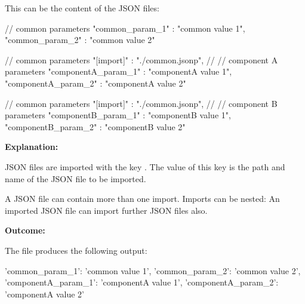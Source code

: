 \vspace{2ex}

This can be the content of the JSON files:

\vspace{2ex}

\textbullet {}

\begin{pythoncode}
{
   // common parameters
   "common_param_1" : "common value 1",
   "common_param_2" : "common value 2"
}
\end{pythoncode}

\textbullet {}

\begin{pythoncode}[linebackgroundcolor=\hlcode{3}]
{
   // common parameters
   "[import]" : "./common.jsonp",
   //
   // component A parameters
   "componentA_param_1" : "componentA value 1",
   "componentA_param_2" : "componentA value 2"
}
\end{pythoncode}

\textbullet {}

\begin{pythoncode}[linebackgroundcolor=\hlcode{3}]
{
   // common parameters
   "[import]" : "./common.jsonp",
   //
   // component B parameters
   "componentB_param_1" : "componentB value 1",
   "componentB_param_2" : "componentB value 2"
}
\end{pythoncode}

\textbf{Explanation:}

\vspace{2ex}

JSON files are imported with the key . The value of this key is the path and name of the JSON file to be imported.

A JSON file can contain more than one import. Imports can be nested: An imported JSON file can import further JSON files also.


\newpage

\textbf{Outcome:}

The file  produces the following output:

\begin{pythonlog}
{'common_param_1': 'common value 1',
 'common_param_2': 'common value 2',
 'componentA_param_1': 'componentA value 1',
 'componentA_param_2': 'componentA value 2'}
\end{pythonlog}

